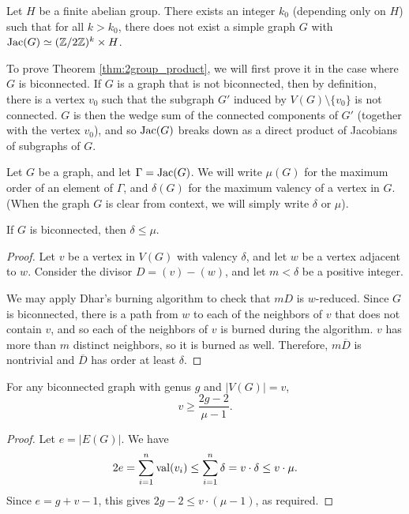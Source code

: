 \documentclass{amsart}
\begin{document}
\begin{thm}
  \label{thm:2group_product}
  Let $H$ be a finite abelian group. There exists an integer $k_0$
  (depending only on $H$) such that for all $k > k_0$, there does not exist
  a simple graph $G$ with $\operatorname{Jac}(G) \simeq (\mathbb{Z}/2\mathbb{Z})^k \times H$.
\end{thm}

To prove Theorem \ref{thm:2group_product}, we will first prove it in the case
where $G$ is biconnected. If $G$ is a
graph that is not biconnected, then by definition, there is a vertex
$v_0$ such that the subgraph $G'$ induced by $V(G) \setminus \{v_0\}$
is not connected. $G$ is then the wedge sum of the connected components of
$G'$ (together with the vertex $v_0$), and so $\operatorname{Jac}(G)$ breaks down as
a direct product of Jacobians of subgraphs of $G$.

\begin{defn}
  Let $G$ be a graph, and let $\Gamma = \operatorname{Jac}(G)$. We will write $\mu(G)$
  for the maximum order of an element of $\Gamma$, and $\delta(G)$ for
  the maximum valency of a vertex in $G$. (When the graph $G$ is clear
  from context, we will simply write $\delta$ or $\mu$). 
\end{defn}

\begin{lem}
  \label{lem:delta_le_mu}
  If $G$ is biconnected, then $\delta \le \mu$.
\end{lem}
\begin{proof}
  Let $v$ be a vertex in $V(G)$ with valency $\delta$, and let $w$ be
  a vertex adjacent to $w$. Consider the divisor $D = (v) -
  (w)$, and let $m < \delta$ be a positive integer. 

  We may apply Dhar's burning algorithm to check that $mD$ is
  $w$-reduced. Since $G$ is biconnected, there is a path from $w$ to
  each of the neighbors of $v$ that does not contain $v$, and so each
  of the neighbors of $v$ is burned during the algorithm. $v$ has more
  than $m$ distinct neighbors, so it is burned as well. Therefore,
  $m\overline{D}$ is nontrivial and $\overline{D}$ has order at least
  $\delta$.
\end{proof}

\begin{cor}
  \label{cor:genus_v_mu}
  For any biconnected graph with genus $g$ and $|V(G)| = v$,
  \begin{equation*}
    v \ge \frac{2g - 2}{\mu - 1}.
  \end{equation*}
\end{cor}
\begin{proof}
  Let $e = |E(G)|$. We have 
  \begin{equation*}
    2e = \sum_{i=1}^n \operatorname{val}(v_i) \le \sum_{i=1}^n \delta = v \cdot \delta
    \le v \cdot \mu.
  \end{equation*}
  Since $e = g + v - 1$, this gives $2g - 2 \le v \cdot (\mu - 1)$, as required.
\end{proof}
\end{document}
